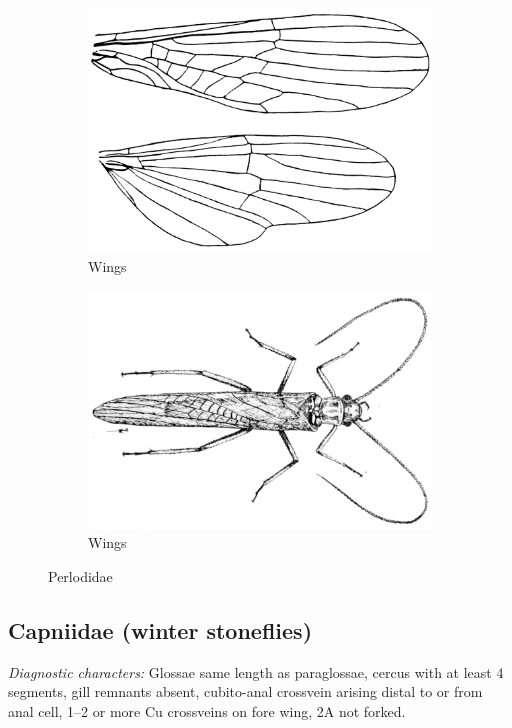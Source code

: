 \documentclass[letterpaper, 11pt]{article}
\begin{document}
\begin{figure}[ht!]
    \centering
    \begin{subfigure}[ht!]{0.4\textwidth}
        \includegraphics[width=\textwidth]{LeuctridWings}
        \caption{Wings \citep[modified from][Plate 32, Fig. 1]{bhl29875}}
        \label{fig:leuctrid1}
    \end{subfigure}
    \qquad
    \begin{subfigure}[ht!]{0.5\textwidth}
        \includegraphics[width=\textwidth]{LeuctridHabitus}
        \caption{Wings \citep[modified from][Fig. 26]{bhl29875}}
        \label{fig:leuctrid2}
    \end{subfigure}
    \caption{Perlodidae}\label{fig:leuctrids}
\end{figure}

\subsection{Capniidae (winter stoneflies)}
\noindent{}\textit{Diagnostic characters:} Glossae same length as paraglossae, cercus with at least 4 segments, gill remnants absent, cubito-anal crossvein arising distal to or from anal cell, 1--2 or more Cu crossveins on fore wing, 2A not forked.\\
\end{document}
